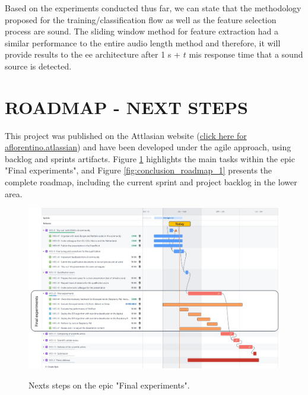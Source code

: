 
Based on the experiments conducted thus far, we can state that the methodology proposed for the training/classification flow as well as the feature selection process are sound. The sliding window method for feature extraction had a similar performance to the entire audio length method and therefore, it will provide results to the \gls{ee} architecture after 1 \gls{s} + $t$ \gls{mi}\gls{s} response time that a sound source is detected.


\section{ROADMAP - NEXT STEPS}
\label{sec:results_roadmap}

This project was published on the Attlasian website (\href{https://aflorentino.atlassian.net/jira/software/c/projects/MES/boards/1/backlog?epics=visible}{click here for aflorentino.atlassian}) and have been developed under the agile approach, using backlog and sprints artifacts. Figure \ref{fig:conclusion_roadmap_2} highlights the main tasks within the epic "Final experiments", and Figure \ref{fig:conclusion_roadmap_1} presents the complete roadmap, including the current sprint and project backlog in the lower area.

\begin{figure}[htbp]
    \raggedright
        \caption{Nexts steps on the epic "Final experiments".}
        \includegraphics[width=1\textwidth]{resources/images/070-conclusion/Conclusion_roadmap_02.jpg}
        \label{fig:conclusion_roadmap_2}
\end{figure}

